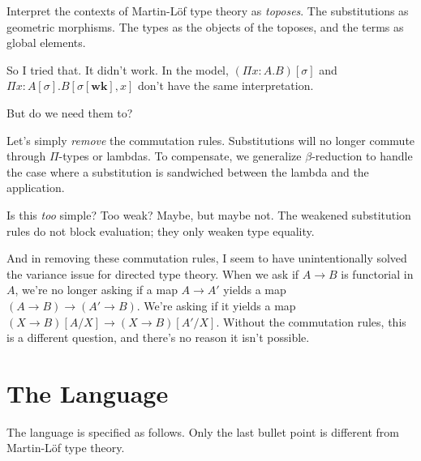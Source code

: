 \documentclass{article}
\begin{document}
Interpret the contexts of Martin-L\"of type theory as \emph{toposes}. The substitutions as geometric morphisms.
The types as the objects of the toposes, and the terms as global elements.

So I tried that. It didn't work. In the model, \((\Pi x : A. B)[\sigma]\)
and \(\Pi x : A[\sigma]. B[\sigma[\mathbf{wk}], x]\) don't have the same interpretation.

But do we need them to?

Let's simply \emph{remove} the commutation rules.
Substitutions will no longer commute through \(\Pi\)-types or lambdas.
To compensate, we generalize \(\beta\)-reduction to handle the case
where a substitution is sandwiched between the lambda and the application.

Is this \emph{too} simple? Too weak? Maybe, but maybe not.
The weakened substitution rules do not block evaluation;
they only weaken type equality.

And in removing these commutation rules,
I seem to have unintentionally solved the variance issue for directed type theory.
When we ask if \(A \to B\) is functorial in \(A\), we're no longer asking
if a map \(A \to A'\) yields a map \((A \to B) \to (A' \to B)\).
We're asking if it yields a map \((X \to B)[A/X] \to (X \to B)[A'/X]\).
Without the commutation rules, this is a different question,
and there's no reason it isn't possible.

\section{The Language}

\newcommand{\Cx}{\mathsf{Cx}}
\newcommand{\Sb}{\mathsf{Sb}}
\newcommand{\Ty}{\mathsf{Ty}}
\newcommand{\Tm}{\mathsf{Tm}}

The language is specified as follows. Only the last bullet point is different from Martin-L\"of type theory.
\end{document}
